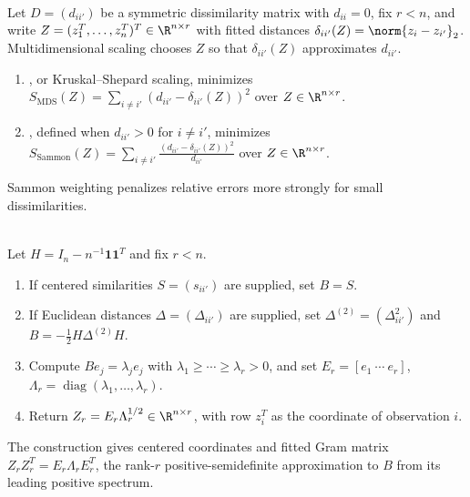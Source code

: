 \begin{definition} \label{def:sl-multidimensional-scaling} \\
Let $D=(d_{ii'})$ be a symmetric dissimilarity matrix with $d_{ii}=0$, fix $r<n$, and write $Z=(z_1^T,\ldots,z_n^T)^T\in\R^{n\times r}$ with fitted distances $\delta_{ii'}(Z)=\norm{z_i-z_{i'}}_2$.
Multidimensional scaling chooses $Z$ so that $\delta_{ii'}(Z)$ approximates $d_{ii'}$.
\begin{enumerate}[label=(\roman*)]
\setlength{\itemsep}{0pt}
\item {}, or Kruskal--Shepard scaling, minimizes $S_{\mathrm{MDS}}(Z)=\sum\limits_{i\neq i'}(d_{ii'}-\delta_{ii'}(Z))^2$ over $Z\in\R^{n\times r}$.
\item {}, defined when $d_{ii'}>0$ for $i\neq i'$, minimizes $S_{\mathrm{Sammon}}(Z)=\sum\limits_{i\neq i'}\frac{(d_{ii'}-\delta_{ii'}(Z))^2}{d_{ii'}}$ over $Z\in\R^{n\times r}$.
\end{enumerate}
Sammon weighting penalizes relative errors more strongly for small dissimilarities.
\end{definition}

\begin{method} \label{meth:sl-classical-multidimensional-scaling} \\
Let $H=I_n-n^{-1}\mathbf{1}\mathbf{1}^T$ and fix $r<n$.
\begin{enumerate}[label=(\roman*)]
\setlength{\itemsep}{0pt}
\item If centered similarities $S=(s_{ii'})$ are supplied, set $B=S$.
\item If Euclidean distances $\Delta=(\Delta_{ii'})$ are supplied, set $\Delta^{(2)}=(\Delta_{ii'}^2)$ and $B=-\frac12H\Delta^{(2)}H$.
\item Compute $Be_j=\lambda_je_j$ with $\lambda_1\geq\cdots\geq\lambda_r>0$, and set $E_r=[e_1\ \cdots\ e_r]$, $\Lambda_r=\operatorname{diag}(\lambda_1,\ldots,\lambda_r)$.
\item Return $Z_r=E_r\Lambda_r^{1/2}\in\R^{n\times r}$, with row $z_i^T$ as the coordinate of observation $i$.
\end{enumerate}
The construction gives centered coordinates and fitted Gram matrix $Z_rZ_r^T=E_r\Lambda_rE_r^T$, the rank-$r$ positive-semidefinite approximation to $B$ from its leading positive spectrum.
\end{method}

